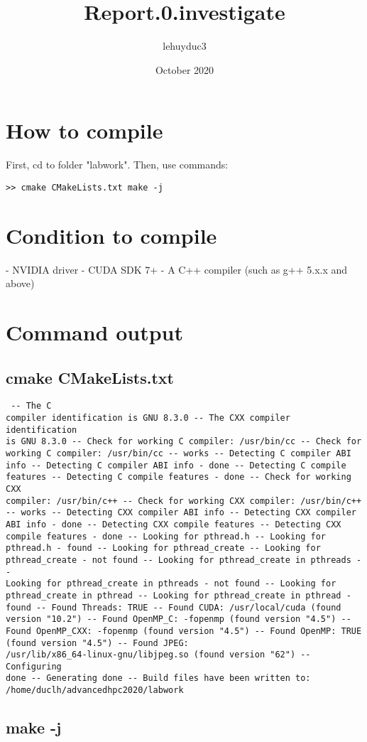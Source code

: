 \documentclass{article} \usepackage[utf8]{inputenc}
\title{Report.0.investigate} \author{lehuyduc3 } \date{October 2020}
\begin{document}
 \maketitle 
\section{How to compile} First, cd to folder "labwork". Then, use 
commands: \\ \begin{verbatim}
>> cmake CMakeLists.txt make -j
\end{verbatim} \section{Condition to compile} - NVIDIA driver - CUDA SDK 
7+ - A C++ compiler (such as g++ 5.x.x and above) \section{Command 
output} \subsection{cmake CMakeLists.txt} \begin{verbatim} -- The C 
compiler identification is GNU 8.3.0 -- The CXX compiler identification 
is GNU 8.3.0 -- Check for working C compiler: /usr/bin/cc -- Check for 
working C compiler: /usr/bin/cc -- works -- Detecting C compiler ABI 
info -- Detecting C compiler ABI info - done -- Detecting C compile 
features -- Detecting C compile features - done -- Check for working CXX 
compiler: /usr/bin/c++ -- Check for working CXX compiler: /usr/bin/c++ 
-- works -- Detecting CXX compiler ABI info -- Detecting CXX compiler 
ABI info - done -- Detecting CXX compile features -- Detecting CXX 
compile features - done -- Looking for pthread.h -- Looking for 
pthread.h - found -- Looking for pthread_create -- Looking for 
pthread_create - not found -- Looking for pthread_create in pthreads -- 
Looking for pthread_create in pthreads - not found -- Looking for 
pthread_create in pthread -- Looking for pthread_create in pthread - 
found -- Found Threads: TRUE -- Found CUDA: /usr/local/cuda (found 
version "10.2") -- Found OpenMP_C: -fopenmp (found version "4.5") -- 
Found OpenMP_CXX: -fopenmp (found version "4.5") -- Found OpenMP: TRUE 
(found version "4.5") -- Found JPEG: 
/usr/lib/x86_64-linux-gnu/libjpeg.so (found version "62") -- Configuring 
done -- Generating done -- Build files have been written to: 
/home/duclh/advancedhpc2020/labwork \end{verbatim} \subsection{make -j} 
\end{document}
